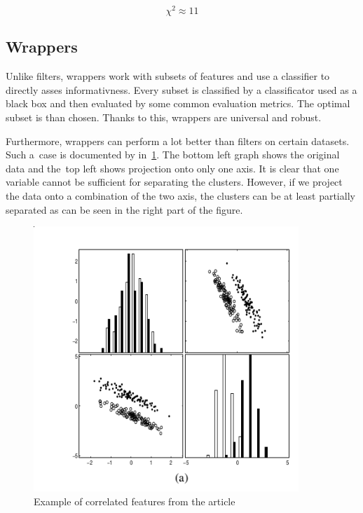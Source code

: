 \begin{equation}
\chi^2 \approx 11
\end{equation}



\subsection{Wrappers}

Unlike filters, wrappers work with subsets of features and use a classifier to directly asses informativness.
Every subset is classified by a classificator used as a black box and then evaluated by some common evaluation metrics.
The optimal subset is than chosen. Thanks to this, wrappers are universal and robust.

Furthermore, wrappers can perform a lot better than filters on certain datasets. Such a~case is documented by \citet{GuyEli03} in~\ref{fig:guyeli03-figure3}. The bottom left graph shows the original data and the~top left shows projection onto only one axis. It is clear that one variable cannot be sufficient for separating the clusters. However, if we project the data onto a combination of the two axis, the clusters can be at least partially separated as can be seen in the right part of the figure.
 

\begin{figure}[ht]\centering
\includegraphics[width=100mm]{../img/guyeli_figure3.png}
\caption{Example of correlated features from the article}
\label{fig:guyeli03-figure3}
\end{figure}

